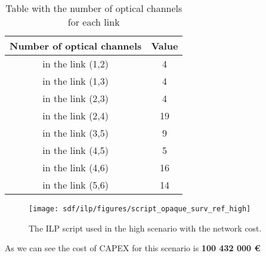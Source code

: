 \begin{table}[h!]
\centering
\begin{tabular}{|| c | c||}
 \hline
 Number of optical channels & Value \\
 \hline\hline
 in the link (1,2) & 4 \\
 in the link (1,3) & 4 \\
 in the link (2,3) & 4 \\
 in the link (2,4) & 19 \\
 in the link (3,5) & 9 \\
 in the link (4,5) & 5 \\
 in the link (4,6) & 16 \\
 in the link (5,6) & 14 \\
 \hline
\end{tabular}
\caption{Table with the number of optical channels for each link}
\label{result_ILP3_reference}
\end{table}


\begin{figure}[h!]
\centering
\texttt{[image: sdf/ilp/figures/script\_opaque\_surv\_ref\_high]}
\caption{The ILP script used in the high scenario with the network cost.}
\label{scriptopaque_surv_ref_high}
\end{figure}

As we can see the cost of CAPEX for this scenario is \textbf{100 432 000 \euro}\\
